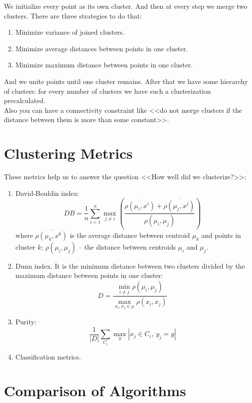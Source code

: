 We initialize every point as its own cluster. And then at every step we merge two clusters. There are three strategies to do that:
\begin{enumerate}
	\item Minimize variance of joined clusters.
	\item Minimize average distances between points in one cluster.
	\item Minimize maximum distance between points in one cluster.
\end{enumerate}
And we unite points until one cluster remains. After that we have some hierarchy of clusters: for every number of clusters we have such a clusterization precalculated.\\
Also you can have a connectivity constraint like <<do not merge clusters if the distance between them is more than some constant>>.

\section{Clustering Metrics}

These metrics help us to answer the question <<How well did we clusterize?>>:
\begin{enumerate}
	\item David-Bouldin index: $$DB=\frac{1}{n}\sum\limits_{i=1}^{n}\max\limits_{j\ne i}\left(\frac{\overline{\rho(\mu_i,x^i)}+\overline{\rho(\mu_j,x^j)}}{\rho(\mu_i,\mu_j)}\right)$$ where $\overline{\rho(\mu_k,x^k)}$ is the average distance between centroid $\mu_k$ and points in cluster $k$; $\rho(\mu_i,\mu_j)$ -- the distance between centroids $\mu_i$ and $\mu_j$.
	\item Dunn index. It is the minimum distance between two clusters divided by the maximum distance between points in one cluster: $$D=\frac{\min\limits_{i\ne j}\rho(\mu_i,\mu_j)}{\max\limits_{x_i,x_j\in\mu}\rho(x_i,x_j)}$$
	\item Purity: $$\frac{1}{|D|}\sum\limits_{C_i}\max\limits_{y}|x_j\in C_i,\ y_j=y|$$
	\item Classification metrics.
\end{enumerate}

\section{Comparison of Algorithms}

